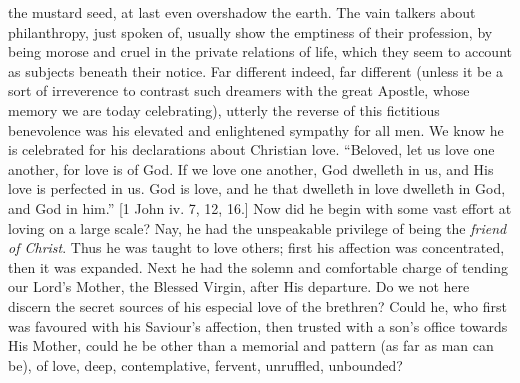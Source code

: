the mustard seed, at last even overshadow the earth. The vain talkers
about philanthropy, just spoken of, usually show the emptiness of
their profession, by being morose and cruel in the private relations
of life, which they seem to account as subjects beneath their notice.
Far different indeed, far different (unless it be a sort of
irreverence to contrast such dreamers with the great Apostle, whose
memory we are today celebrating), utterly the reverse of this
fictitious benevolence was his elevated and enlightened sympathy for
all men. We know he is celebrated for his declarations about Christian
love. ``Beloved, let us love one another, for love is of God. If
we love one another, God dwelleth in us, and His love is perfected in
us. God is love, and he that dwelleth in love dwelleth in God, and God
in him.'' [1 John iv. 7, 12, 16.] Now did he begin with some vast
effort at loving on a large scale? Nay, he had the unspeakable
privilege of being the \emph{friend of Christ}. Thus he was taught to
love others; first his affection was concentrated, then it was
expanded. Next he had the solemn and comfortable charge of tending our
Lord's Mother, the Blessed Virgin, after His departure. Do we not here
discern the secret sources of his especial love of the brethren? Could
he, who first was favoured with his Saviour's affection, then trusted
with a son's office towards His Mother, could he be other than a
memorial and pattern (as far as man can be), of love, deep,
contemplative, fervent, unruffled, unbounded?


